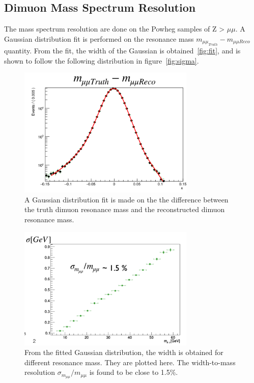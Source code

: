 
\subsection{Dimuon Mass Spectrum Resolution}
The mass spectrum resolution are done on the Powheg samples of Z > $\mu \mu
$. A Gaussian distribution fit is performed on the resonance mass $m_{\mu\mu_{Truth}} - m_{\mu\mu{Reco}}$ quantity. From the fit, the width of the Gaussian is obtained~\ref{fig:fit}, and is shown to follow the following distribution in figure~\ref{fig:sigma}.
    

\begin{figure}[!htb]
    \begin{center}
        \includegraphics[width=0.75\textwidth]{figures/chapter_dimuon/fitError}        
        \caption{
            A Gaussian distribution fit is made on the the difference between the truth dimuon resonance mass and the reconstructed dimuon resonance mass. }
    \end{center}
\end{figure}
   
\begin{figure}[!htb]
    \begin{center}
        \includegraphics[width=0.75\textwidth]{figures/chapter_dimuon/sigma}        
        \caption{
        From the fitted Gaussian distribution, the width is obtained for different resonance mass. They are plotted here. The width-to-mass resolution $\sigma_{m_{\mu\mu}}/m_{\mu\mu}$ is found to be close to 1.5\%.}
    \end{center}
\end{figure}


